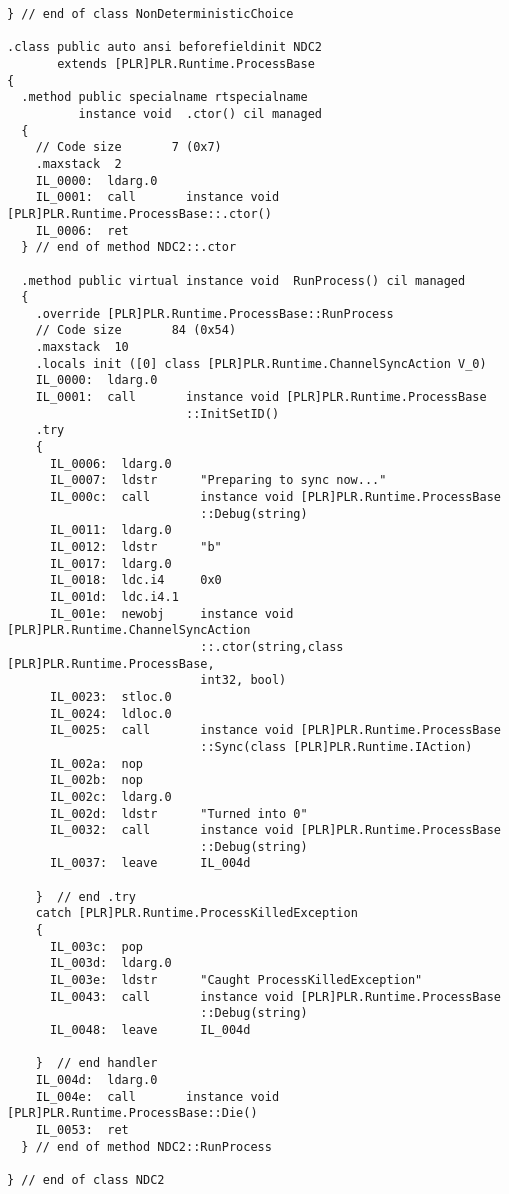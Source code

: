 \begin{lstlisting}
} // end of class NonDeterministicChoice

.class public auto ansi beforefieldinit NDC2
       extends [PLR]PLR.Runtime.ProcessBase
{
  .method public specialname rtspecialname 
          instance void  .ctor() cil managed
  {
    // Code size       7 (0x7)
    .maxstack  2
    IL_0000:  ldarg.0
    IL_0001:  call       instance void [PLR]PLR.Runtime.ProcessBase::.ctor()
    IL_0006:  ret
  } // end of method NDC2::.ctor

  .method public virtual instance void  RunProcess() cil managed
  {
    .override [PLR]PLR.Runtime.ProcessBase::RunProcess
    // Code size       84 (0x54)
    .maxstack  10
    .locals init ([0] class [PLR]PLR.Runtime.ChannelSyncAction V_0)
    IL_0000:  ldarg.0
    IL_0001:  call       instance void [PLR]PLR.Runtime.ProcessBase
                         ::InitSetID()
    .try
    {
      IL_0006:  ldarg.0
      IL_0007:  ldstr      "Preparing to sync now..."
      IL_000c:  call       instance void [PLR]PLR.Runtime.ProcessBase
                           ::Debug(string)
      IL_0011:  ldarg.0
      IL_0012:  ldstr      "b"
      IL_0017:  ldarg.0
      IL_0018:  ldc.i4     0x0
      IL_001d:  ldc.i4.1
      IL_001e:  newobj     instance void [PLR]PLR.Runtime.ChannelSyncAction
                           ::.ctor(string,class [PLR]PLR.Runtime.ProcessBase,
                           int32, bool)
      IL_0023:  stloc.0
      IL_0024:  ldloc.0
      IL_0025:  call       instance void [PLR]PLR.Runtime.ProcessBase
                           ::Sync(class [PLR]PLR.Runtime.IAction)
      IL_002a:  nop
      IL_002b:  nop
      IL_002c:  ldarg.0
      IL_002d:  ldstr      "Turned into 0"
      IL_0032:  call       instance void [PLR]PLR.Runtime.ProcessBase
                           ::Debug(string)
      IL_0037:  leave      IL_004d

    }  // end .try
    catch [PLR]PLR.Runtime.ProcessKilledException 
    {
      IL_003c:  pop
      IL_003d:  ldarg.0
      IL_003e:  ldstr      "Caught ProcessKilledException"
      IL_0043:  call       instance void [PLR]PLR.Runtime.ProcessBase
                           ::Debug(string)
      IL_0048:  leave      IL_004d

    }  // end handler
    IL_004d:  ldarg.0
    IL_004e:  call       instance void [PLR]PLR.Runtime.ProcessBase::Die()
    IL_0053:  ret
  } // end of method NDC2::RunProcess

} // end of class NDC2

\end{lstlisting}

